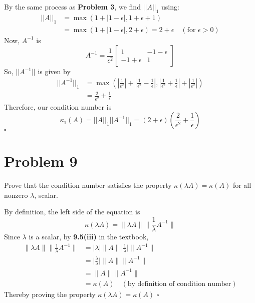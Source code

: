 \documentclass[11pt]{article}
\newenvironment{proof}{\noindent{\bf Proof.}}{\hfill $\square$\medskip}
\begin{document}
\begin{proof}
By the same process as \textbf{Problem 3}, we find $||A||_{1}$ using:
\begin{equation}
    \begin{split}
        ||A||_{1}&=\max(1+|1-\epsilon|,1+\epsilon+1)\\
        &=\max(1+|1-\epsilon|,2+\epsilon)
        =2+\epsilon\quad(\text{for } \epsilon>0)
    \end{split}
\end{equation}
Now, $A^{-1}$ is
$$A^{-1}=\frac{1}{\epsilon^{2}}\begin{bmatrix}
    1&-1-\epsilon\\
    -1+\epsilon&1
\end{bmatrix}$$
So, $||A^{-1}||$ is given by
\begin{equation}
    \begin{split}
        ||A^{-1}||_{1}&=\max\left(\left|\frac{1}{\epsilon^{2}}\right|+\left|\frac{1}{\epsilon^{2}}-\frac{1}{\epsilon}\right|,\left|\frac{1}{\epsilon^{2}}+\frac{1}{\epsilon}\right|+\left|\frac{1}{\epsilon^{2}}\right|\right)\\
        &=\frac{2}{\epsilon^{2}}+\frac{1}{\epsilon}
    \end{split}
\end{equation}
Therefore, our condition number is
$$\kappa_{1}(A)=||A||_{1}||A^{-1}||_{1}=(2+\epsilon)\left(\frac{2}{\epsilon^{2}}+\frac{1}{\epsilon}\right)$$
\end{proof}


\section{Problem 9}
Prove that the condition number satisfies the property $\kappa(\lambda A)=\kappa(A)$ for all nonzero $\lambda$, scalar.

\begin{proof}
By definition, the left side of the equation is
$$\kappa(\lambda A)=\lVert\lambda A\rVert\lVert\frac{1}{\lambda}A^{-1}\rVert$$
Since $\lambda$ is a scalar, by \textbf{9.5(iii)} in the textbook,
\begin{equation}
    \begin{split}
    \lVert\lambda A\rVert\lVert\frac{1}{\lambda}A^{-1}\rVert&=\lvert\lambda\rvert\lVert A\rVert\lvert\frac{1}{\lambda}\rvert\lVert A^{-1}\rVert\\
    &=\lvert\frac{\lambda}{\lambda}\rvert\lVert A\rVert\lVert A^{-1}\rVert\\
    &=\lVert A\rVert\lVert A^{-1}\rVert\\
    &=\kappa(A)\quad(\text{by definition of condition number})
    \end{split}
\end{equation}
Thereby proving the property $\kappa(\lambda A)=\kappa(A)$
\end{proof}
\end{document}
